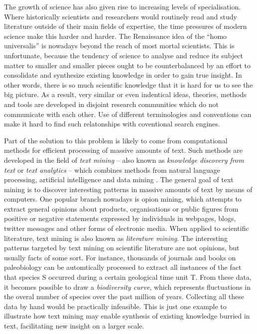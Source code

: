 The growth of science has also given rise to increasing levels of specialisation.
Where historically scientists and researchers would routinely read and study literature outside of their main fields of expertise, the time pressures of modern science make this harder and harder.
The Renaissance idea of the ``homo universalis'' is nowadays beyond the reach of most mortal scientists.
This is unfortunate, because the tendency of science to analyse and reduce its subject matter to smaller and smaller pieces ought to be counterbalanced by an effort to consolidate and synthesize existing knowledge in order to gain true insight.    
In other words, there is so much scientific knowledge that it is hard for us to see the big picture.
As a result, very similar or even indentical ideas, theories, methods and tools are developed in disjoint research communities which do not communicate with each other.
Use of different terminologies and conventions can make it hard to find such relatonships with coventional search engines.  

Part of the solution to this problem is likely to come from computational methods for efficient processing of massive amounts of text.
Such methods are developed in the field of \emph{text mining} -- also known as \emph{knowledge discovery from text} or \emph{text analytics} -- which combines methods from natural language processing, artificial intelligence and data mining \citep{Aggarwal2012Mining,Weiss2012Fundamentals}.
The general goal of text mining is to discover interesting patterns in massive amounts of text by means of computers.
One popular branch nowadays is opion mining, which attempts to extract general opinions about products, organisations or public figures from positive or negative statements expressed by individuals in webpages, blogs, twitter messages and other forms of electronic media.
When applied to scientific literature, text mining is also known as \emph{literature mining}. The interesting patterns targeted by text mining on scientific literature are not opinions, but usually facts of some sort.
For instance, thousands of journals and books on paleobiology can be automtically processed to extract all instances of the fact that species S occurred during a certain geological time unit T.
From these data, it becomes possible to draw a \emph{biodiversity curve}, which represents fluctuations in the overal number of species over the past million of years.
Collecting all these data by hand would be practically infeasible.
This is just one example to illustrate how text mining may enable synthesis of existing knowledge burried in text, facilitating new insight on a larger scale.  

